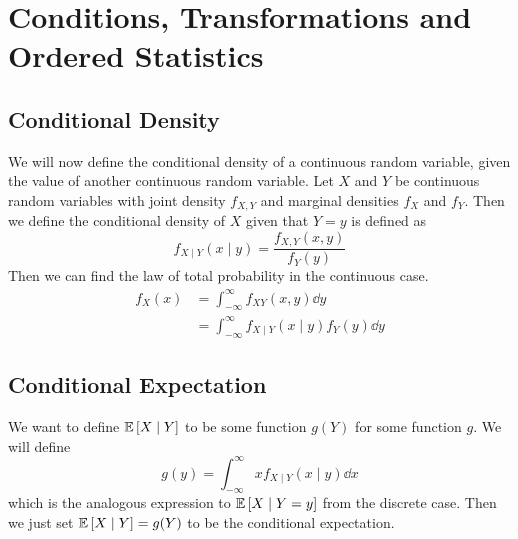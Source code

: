\documentclass{article}
\begin{document}
\section{Conditions, Transformations and Ordered Statistics}
\subsection{Conditional Density}
We will now define the conditional density of a continuous random variable, given the value of another continuous random variable. Let $X$ and $Y$ be continuous random variables with joint density $f_{X, Y}$ and marginal densities $f_X$ and $f_Y$. Then we define the conditional density of $X$ given that $Y = y$ is defined as
\[ f_{X \mid Y}(x \mid y) = \frac{f_{X, Y}(x, y)}{f_Y(y)} \]
Then we can find the law of total probability in the continuous case.
\begin{align*}
	f_X(x) & = \int_{-\infty}^\infty f_{XY}(x, y) \dd{y}                 \\
	       & = \int_{-\infty}^\infty f_{X \mid Y}(x \mid y)f_Y(y) \dd{y}
\end{align*}

\subsection{Conditional Expectation}
We want to define $\mathbb{E}\left[{X \mid Y}\right]$ to be some function $g(Y)$ for some function $g$. We will define
\[ g(y) = \int_{-\infty}^\infty xf_{X \mid Y}(x \mid y) \dd{x} \]
which is the analogous expression to $\mathbb{E}\left[{X \mid Y = y}\right]$ from the discrete case. Then we just set $\mathbb{E}\left[{X \mid Y}\right] = g(Y)$ to be the conditional expectation.
\end{document}
